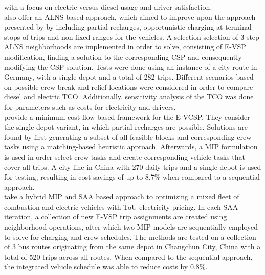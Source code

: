 \documentclass[]{article}
\begin{document}
with a focus on electric versus diesel usage and driver satisfaction. \\
\citet{Sistig2023} also offer an ALNS based approach, which aimed to improve upon the approach presented by \citet{Perumal2021} by including partial recharges, opportunistic charging at terminal stops of trips and non-fixed ranges for the vehicles. A selection selection of 3-step ALNS neighborhoods are implemented in order to solve, consisting of E-VSP modification, finding a solution to the corresponding CSP and consequently modifying the CSP solution. Tests were done using an instance of a city route in Germany, with a single depot and a total of 282 trips. Different scenarios based on possible crew break and relief locations were considered in order to compare diesel and electric TCO. Additionally, sensitivity analysis of the TCO was done for parameters such as costs for electricity and drivers. \\
\citet{Shen2023} provide a minimum-cost flow based framework for the E-VCSP. They consider the single depot variant, in which partial recharges are possible. Solutions are found by first generating a subset of all feasible blocks and corresponding crew tasks using a matching-based heuristic approach. Afterwards, a MIP formulation is used in order select crew tasks and create corresponding vehicle tasks that cover all trips. A city line in China with 270 daily trips and a single depot is used for testing, resulting in cost savings of up to 8.7\% when compared to a sequential approach. \\
\citet{Cong2024} take a hybrid MIP and SAA based approach to optimizing a mixed fleet of combustion and electric vehicles with ToU electricity pricing. In each SAA iteration, a collection of new E-VSP trip assignments are created using neighborhood operations, after which two MIP models are sequentially employed to solve for charging and crew schedules. The methods are tested on a collection of 3 bus routes originating from the same depot in Changchun City, China with a total of 520 trips across all routes. When compared to the sequential approach, the integrated vehicle schedule was able to reduce costs by 0.8\%. 
\end{document}
